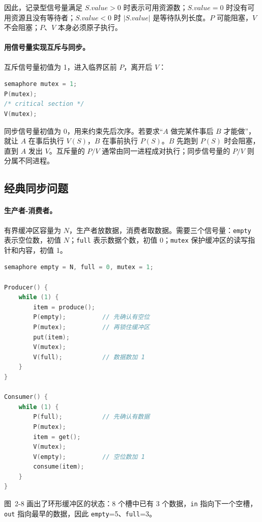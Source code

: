 因此，记录型信号量满足 $S.value>0$ 时表示可用资源数；$S.value=0$ 时没有可用资源且没有等待者；$S.value<0$ 时 $|S.value|$ 是等待队列长度。$P$ 可能阻塞，$V$ 不会阻塞；$P$、$V$ 本身必须原子执行。

\paragraph{用信号量实现互斥与同步。} 互斥信号量初值为 1，进入临界区前 $P$，离开后 $V$：

\begin{lstlisting}[language=C]
semaphore mutex = 1;
P(mutex);
/* critical section */
V(mutex);
\end{lstlisting}

同步信号量初值为 0，用来约束先后次序。若要求“$A$ 做完某件事后 $B$ 才能做”，就让 $A$ 在事后执行 $V(S)$，$B$ 在事前执行 $P(S)$。$B$ 先跑到 $P(S)$ 时会阻塞，直到 $A$ 发出 $V$。互斥量的 $P/V$ 通常由同一进程成对执行；同步信号量的 $P/V$ 则分属不同进程。

\subsection{经典同步问题}

\paragraph{生产者-消费者。} 有界缓冲区容量为 $N$，生产者放数据，消费者取数据。需要三个信号量：\texttt{empty} 表示空位数，初值 $N$；\texttt{full} 表示数据个数，初值 0；\texttt{mutex} 保护缓冲区的读写指针和内容，初值 1。

\begin{lstlisting}[language=C]
semaphore empty = N, full = 0, mutex = 1;

Producer() {
    while (1) {
        item = produce();
        P(empty);          // 先确认有空位
        P(mutex);          // 再锁住缓冲区
        put(item);
        V(mutex);
        V(full);           // 数据数加 1
    }
}

Consumer() {
    while (1) {
        P(full);           // 先确认有数据
        P(mutex);
        item = get();
        V(mutex);
        V(empty);          // 空位数加 1
        consume(item);
    }
}
\end{lstlisting}

图~2-8 画出了环形缓冲区的状态：8 个槽中已有 3 个数据，\texttt{in} 指向下一个空槽，\texttt{out} 指向最早的数据，因此 \texttt{empty}=5、\texttt{full}=3。

